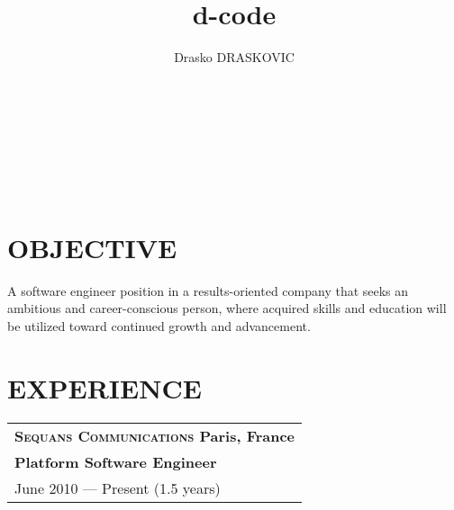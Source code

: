 \documentclass[a4paper, oneside, final]{scrartcl}
\title{d-code}
\author{Drasko DRASKOVIC}
\begin{document}

\titleformat{\section}{\large\scshape\raggedright}{}{0em}{}[\titlerule]

 
\begin{center}

   \textsc{\huge{}}

   \\

\end{center}

 



\section{OBJECTIVE}
   A software engineer position in a results-oriented company that seeks an
   ambitious and career-conscious person, where acquired skills and education
   will be utilized toward continued growth and advancement.


\section{EXPERIENCE}



\newcommand{\gray}{\rowcolor[gray]{.90}}
   \begin{tabularx}{1.0\linewidth}{X}
      \gray \bf\textsc{\large{Sequans Communications}} \normalfont\hfill Paris, France\\
      \gray \bf{Platform Software Engineer}\\
      \gray June 2010 --- Present (1.5 years) \\
   \end{tabularx}
\end{document}
